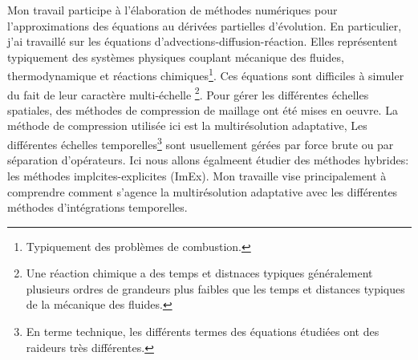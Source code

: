 Mon travail participe à l'élaboration de méthodes numériques pour l'approximations des équations au dérivées partielles d'évolution.
En particulier, j'ai travaillé sur les équations d'advections-diffusion-réaction. Elles représentent typiquement des systèmes physiques couplant
mécanique des fluides, thermodynamique et réactions chimiques\footnote{Typiquement des problèmes de combustion.}.
Ces équations sont difficiles à simuler du fait de leur caractère multi-échelle
\footnote{Une réaction chimique a des temps et distnaces typiques généralement plusieurs ordres de grandeurs plus faibles que les temps et distances typiques de la mécanique des fluides.}.
Pour gérer les différentes échelles spatiales, des méthodes de compression de maillage ont été mises en oeuvre. 
La méthode de compression utilisée ici est la multirésolution adaptative, 
Les différentes échelles temporelles\footnote{En terme technique, les différents termes des équations étudiées ont des raideurs très différentes.} sont 
usuellement gérées par force brute ou par séparation d'opérateurs. Ici nous allons égalmeent étudier des méthodes hybrides: les méthodes implcites-explicites (ImEx).
Mon travaille vise principalement à comprendre comment s'agence la multirésolution adaptative avec les différentes méthodes d'intégrations temporelles.